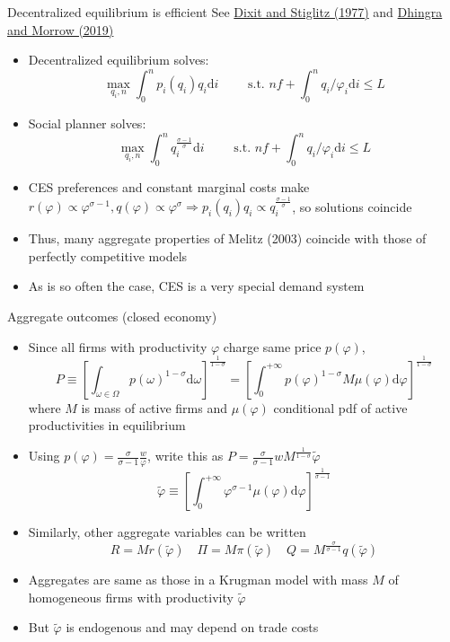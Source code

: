 \documentclass[10pt,notes=hide]{beamer}
\begin{document}
\begin{frame}{Decentralized equilibrium is efficient}
See \href{https://www.jstor.org/stable/1831401}{Dixit and Stiglitz (1977)} and \href{https://www.journals.uchicago.edu/doi/pdfplus/10.1086/700732}{Dhingra and Morrow (2019)}
\begin{itemize}
\item Decentralized equilibrium solves:
$$
\max_{q_i,n} \int_{0}^{n} p_i(q_i) q_i \textrm{d}i 
\qquad
\text{ s.t. }
nf +  \int_{0}^{n} q_i / \varphi_{i} \textrm{d}i \leq L
$$
\item Social planner solves:
$$
\max_{q_i,n} \int_{0}^{n} q_i^{\frac{\sigma-1}{\sigma}} \textrm{d}i 
\qquad
\text{ s.t. }
nf +  \int_{0}^{n} q_i / \varphi_{i} \textrm{d}i \leq L
$$
\item CES preferences and constant marginal costs make 
$r(\varphi) \propto \varphi^{\sigma-1}, q(\varphi) \propto \varphi^{\sigma}\Rightarrow p_i(q_i) q_i \propto q_i^{\frac{\sigma-1}{\sigma}}$, so solutions coincide
\item Thus, many aggregate properties of Melitz (2003) coincide with those of perfectly competitive models
\item As is so often the case, CES is a very special demand system
\end{itemize}
\end{frame}
\begin{frame}{Aggregate outcomes (closed economy)}
\begin{itemize}
\item Since all firms with productivity $\varphi$ charge same price $p(\varphi)$,
$$
P
\equiv
\left[\int_{\omega\in\Omega} p(\omega)^{1-\sigma} \textrm{d} \omega \right]^{\frac{1}{1-\sigma}} 
=
\left[\int_{0}^{+\infty} p(\varphi)^{1-\sigma} M \mu(\varphi) \textrm{d} \varphi \right]^{\frac{1}{1-\sigma}} 
$$
where $M$ is mass of active firms and $\mu(\varphi)$ conditional pdf of active productivities in equilibrium
\item Using $p(\varphi) = \frac{\sigma}{\sigma-1}\frac{w}{\varphi}$, write this as $P = \frac{\sigma}{\sigma-1} w M^{\frac{1}{1-\sigma}} \tilde{\varphi}$
$$
\tilde{\varphi} \equiv \left[\int_{0}^{+\infty} \varphi^{\sigma-1} \mu(\varphi) \textrm{d} \varphi \right]^{\frac{1}{\sigma-1}}
$$
\item Similarly, other aggregate variables can be written
$$
R = M r(\tilde{\varphi})
\quad
\Pi = M \pi(\tilde{\varphi})
\quad
Q = M^{\frac{\sigma}{\sigma-1}} q(\tilde{\varphi})
$$
\item Aggregates are same as those in a Krugman model with mass $M$ of homogeneous firms with productivity $\tilde{\varphi}$
\item But $\tilde{\varphi}$ is endogenous and may depend on trade costs
\end{itemize}
\end{frame}
\end{document}
